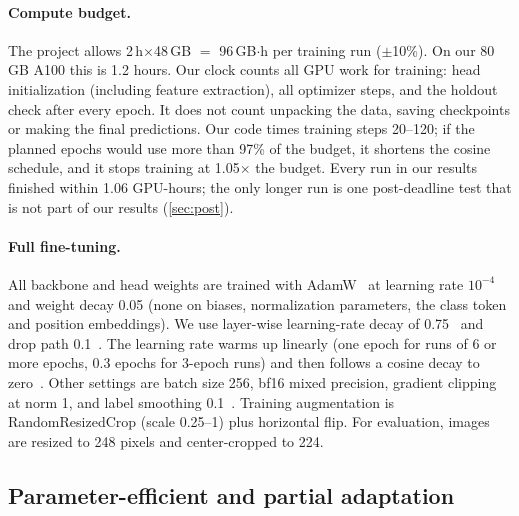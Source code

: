 \paragraph{Compute budget.}
The project allows 2\,h$\times$48\,GB $=$ 96\,GB$\cdot$h per training run ($\pm$10\%).
On our 80\,GB A100 this is 1.2 hours.
Our clock counts all GPU work for training: head initialization (including feature extraction), all optimizer steps, and the holdout check after every epoch.
It does not count unpacking the data, saving checkpoints or making the final predictions.
Our code times training steps 20--120; if the planned epochs would use more than 97\% of the budget, it shortens the cosine schedule, and it stops training at 1.05$\times$ the budget.
Every run in our results finished within 1.06 GPU-hours; the only longer run is one post-deadline test that is not part of our results (\cref{sec:post}).

\paragraph{Full fine-tuning.}
All backbone and head weights are trained with AdamW~\cite{loshchilov2019adamw} at learning rate $10^{-4}$ and weight decay 0.05 (none on biases, normalization parameters, the class token and position embeddings).
We use layer-wise learning-rate decay of 0.75~\cite{bao2022beit} and drop path 0.1~\cite{huang2016stochastic}.
The learning rate warms up linearly (one epoch for runs of 6 or more epochs, 0.3 epochs for 3-epoch runs) and then follows a cosine decay to zero~\cite{loshchilov2017sgdr}.
Other settings are batch size 256, bf16 mixed precision, gradient clipping at norm 1, and label smoothing 0.1~\cite{szegedy2016rethinking}.
Training augmentation is RandomResizedCrop (scale 0.25--1) plus horizontal flip.
For evaluation, images are resized to 248 pixels and center-cropped to 224.

\subsection{Parameter-efficient and partial adaptation}
\label{sec:peft}

